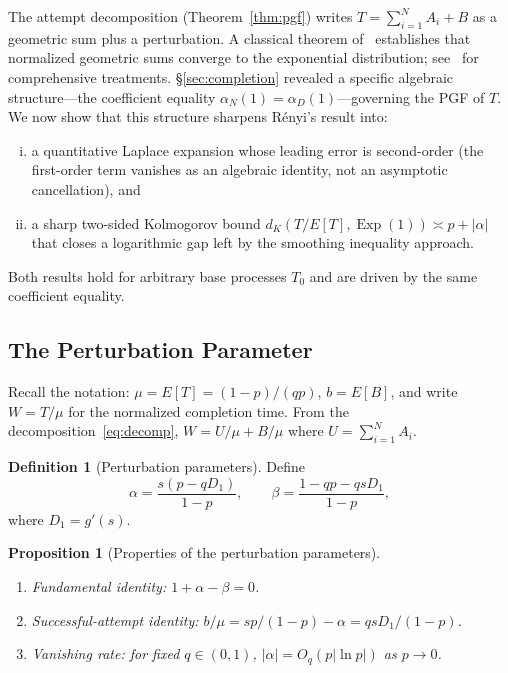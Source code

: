 \documentclass[11pt]{article}
\theoremstyle{plain}
\newtheorem{proposition}[theorem]{Proposition}
\theoremstyle{definition}
\newtheorem{definition}[theorem]{Definition}
\theoremstyle{remark}
\DeclareMathOperator{\Exp}{Exp}
\begin{document}
The attempt decomposition (Theorem~\ref{thm:pgf}) writes $T = \sum_{i=1}^N A_i + B$ as a geometric sum plus a perturbation.  A classical theorem of~\cite{Renyi56} establishes that normalized geometric sums converge to the exponential distribution; see~\cite{GK96, Kalashnikov97} for comprehensive treatments.  \S\ref{sec:completion} revealed a specific algebraic structure---the coefficient equality $\alpha_N(1) = \alpha_D(1)$---governing the PGF of $T$.  We now show that this structure sharpens R\'enyi's result into:
\begin{enumerate}[(i)]
  \item a quantitative Laplace expansion whose leading error is second-order (the first-order term vanishes as an algebraic identity, not an asymptotic cancellation), and
  \item a sharp two-sided Kolmogorov bound $d_K(T/E[T], \Exp(1)) \asymp p + |\alpha|$ that closes a logarithmic gap left by the smoothing inequality approach.
\end{enumerate}
Both results hold for arbitrary base processes $T_0$ and are driven by the same coefficient equality.



\subsection{The Perturbation Parameter}\label{sec:alpha}

Recall the notation: $\mu = E[T] = (1-p)/(qp)$, $b = E[B]$, and write $W = T/\mu$ for the normalized completion time.  From the decomposition~\eqref{eq:decomp}, $W = U/\mu + B/\mu$ where $U = \sum_{i=1}^N A_i$.

\begin{definition}[Perturbation parameters]\label{def:alpha-beta}
Define
\begin{equation}\label{eq:alpha-beta}
  \alpha = \frac{s(p - qD_1)}{1-p}, \qquad \beta = \frac{1 - qp - qsD_1}{1-p},
\end{equation}
where $D_1 = g'(s)$.
\end{definition}

\begin{proposition}[Properties of the perturbation parameters]\label{prop:alpha-properties}
\mbox{}
\begin{enumerate}[\rm (a)]
  \item \label{lem:identity}\emph{Fundamental identity}: $1 + \alpha - \beta = 0$.
  \item \label{lem:b-mu}\emph{Successful-attempt identity}: $b/\mu = sp/(1-p) - \alpha = qsD_1/(1-p)$.
  \item \label{lem:alpha-vanish}\emph{Vanishing rate}: for fixed $q \in (0,1)$, $|\alpha| = O_q(p|\ln p|)$ as $p \to 0$.
\end{enumerate}
\end{proposition}
\end{document}
